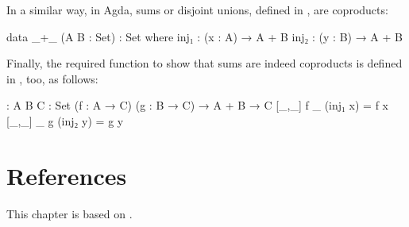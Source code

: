 \begin{example}
  \label{ex:coproduct-agda}


  In a similar way, in Agda, sums or disjoint unions, defined in
  , are coproducts:
  \begin{codeagda}
data _+_ (A B : Set) : Set where
  inj₁ : (x : A) → A + B
  inj₂ : (y : B) → A + B
  \end{codeagda}
  Finally, the required function to show that sums are indeed
  coproducts is defined in , too, as follows:
  \begin{codeagda}
[_,_] : {A B C : Set} (f : A → C) (g : B → C) → A + B → C
[_,_] f _ (inj₁ x) = f x
[_,_] _ g (inj₂ y) = g y
  \end{codeagda}

\end{example}

\section{References}
\label{sec:constructions-references}

This chapter is based on \parencites[15--19]{pierce-1991}[439--440,
  444]{poigne-1992}[63]{maclane-1998}.

\clearemptydoublepage

